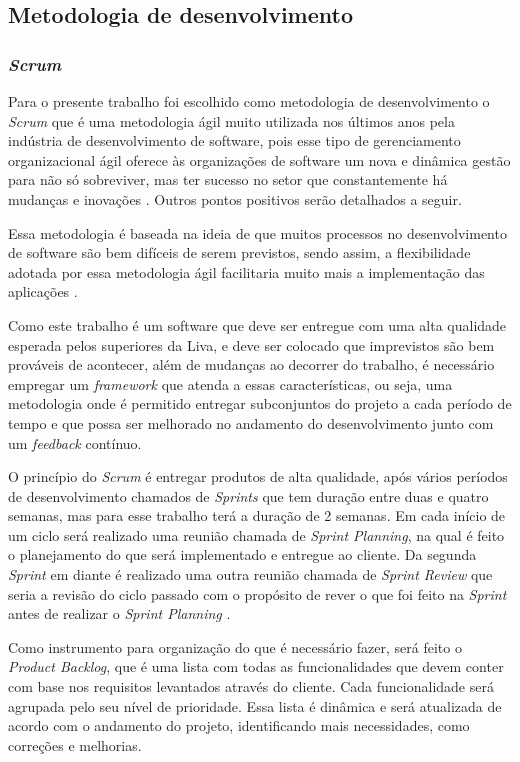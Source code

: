 \subsection{Metodologia de desenvolvimento}

\subsubsection{\textit{Scrum}}

Para o presente trabalho foi escolhido como metodologia de desenvolvimento o \textit{Scrum} que é uma metodologia ágil muito utilizada nos últimos anos pela indústria de desenvolvimento de software, pois esse tipo de  gerenciamento organizacional ágil oferece às organizações de software um nova e dinâmica gestão para não só sobreviver, mas ter sucesso no setor que constantemente há mudanças e inovações \cite{ijcf94}. Outros pontos positivos serão detalhados a seguir.

Essa metodologia é baseada na ideia de que muitos processos no desenvolvimento de software são bem difíceis de serem previstos, sendo assim, a flexibilidade adotada por essa metodologia ágil facilitaria muito mais a implementação das aplicações \cite{ijcf94}.

Como este trabalho é um software que deve ser entregue com uma alta qualidade esperada pelos superiores da Liva, e deve ser colocado que imprevistos são bem prováveis de acontecer, além de mudanças ao decorrer do trabalho, é necessário empregar um \textit{framework} que atenda a essas características, ou seja, uma metodologia onde é permitido entregar subconjuntos do projeto a cada período de tempo e que possa ser melhorado no andamento do desenvolvimento junto com um \textit{feedback} contínuo.

O princípio do \textit{Scrum} é entregar produtos de alta qualidade, após vários períodos de desenvolvimento chamados de \textit{Sprints} que tem duração entre duas e quatro semanas, mas para esse trabalho terá a duração de 2 semanas. Em cada início de um ciclo será realizado uma reunião chamada de \textit{Sprint Planning}, na qual é feito o planejamento do que será implementado e entregue ao cliente. Da segunda \textit{Sprint} em diante é realizado uma outra reunião chamada de \textit{Sprint Review} que seria a revisão do ciclo passado com o propósito de rever o que foi feito na \textit{Sprint} antes de realizar o \textit{Sprint Planning} \cite{ijcf94}.

Como instrumento para organização do que é necessário fazer, será feito o \textit{Product Backlog}, que é uma lista com todas as funcionalidades que devem conter com base nos requisitos levantados através do cliente. Cada funcionalidade será agrupada pelo seu nível de prioridade. Essa lista é dinâmica e será atualizada de acordo com o andamento do projeto, identificando mais necessidades, como correções e melhorias.

